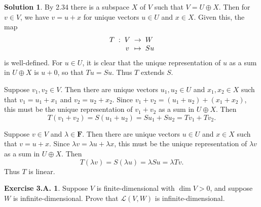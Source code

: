 \documentclass[12pt]{article}
\theoremstyle{definition}
\theoremstyle{exercise}
\newtheorem{exercise}{Exercise 3.A.}
\theoremstyle{solution}
\newtheorem*{solution}{Solution}
\newcommand{\lmap}{\mathcal{L}}
\newcommand{\F}{\mathbf{F}}
\begin{document}
\begin{solution}
    By 2.34 there is a subspace \( X \) of \( V \) such that \( V = U \oplus X \). Then for \( v \in V \), we have \( v = u + x \) for unique vectors \( u \in U \) and \( x \in X \). Given this, the map
    \[
        {
        \setlength{\arraycolsep}{1mm}
        \begin{array}{rcccl}
            T & : & V & \to     & W \\
              &   & v & \mapsto & Su
        \end{array}
        }
    \]
    is well-defined. For \( u \in U \), it is clear that the unique representation of \( u \) as a sum in \( U \oplus X \) is \( u + 0 \), so that \( Tu = Su \). Thus \( T \) extends \( S \).

    Suppose \( v_1, v_2 \in V \). Then there are unique vectors \( u_1, u_2 \in U \) and \( x_1, x_2 \in X \) such that \( v_1 = u_1 + x_1 \) and \( v_2 = u_2 + x_2 \). Since \( v_1 + v_2 = (u_1 + u_2) + (x_1 + x_2) \), this must be the unique representation of \( v_1 + v_2 \) as a sum in \( U \oplus X \). Then
    \[
        T(v_1 + v_2) = S(u_1 + u_2) = Su_1 + Su_2 = T v_1 + T v_2.
    \]
    
    Suppose \( v \in V \) and \( \lambda \in \F \). Then there are unique vectors \( u \in U \) and \( x \in X \) such that \( v = u + x \). Since \( \lambda v = \lambda u + \lambda x \), this must be the unique representation of \( \lambda v \) as a sum in \( U \oplus X \). Then
    \[
        T(\lambda v) = S(\lambda u) = \lambda Su = \lambda Tv.
    \]
    Thus \( T \) is linear.
\end{solution}

\begin{exercise}
\label{ex:12}
    Suppose \( V \) is finite-dimensional with \( \dim V > 0 \), and suppose \( W \) is infinite-dimensional. Prove that \( \lmap(V, W) \) is infinite-dimensional.
\end{exercise}
\end{document}
